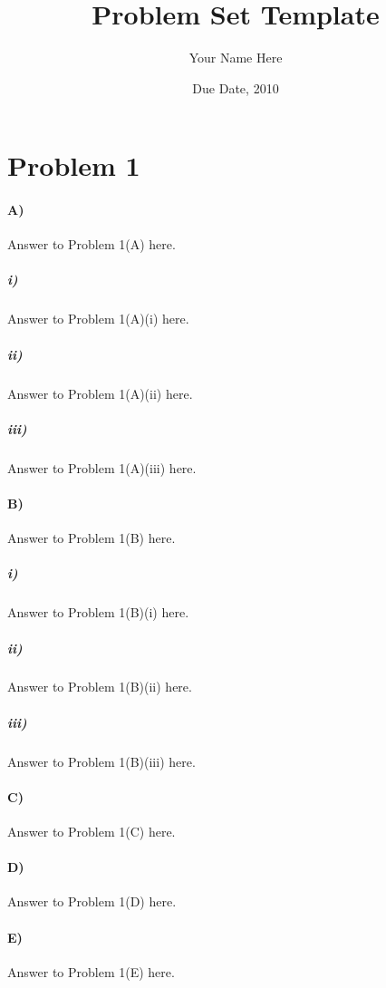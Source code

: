 \documentclass[10pt,letter]{article}
\begin{document}


\title{Problem Set Template}

\author{Your Name Here}

\date{Due Date, 2010}

\maketitle


\section*{Problem 1}

\paragraph{A)} Answer to Problem 1(A) here.

\subparagraph{i)} Answer to Problem 1(A)(i) here.

\subparagraph{ii)} Answer to Problem 1(A)(ii) here.

\subparagraph{iii)} Answer to Problem 1(A)(iii) here.

\paragraph{B)} Answer to Problem 1(B) here.

\subparagraph{i)} Answer to Problem 1(B)(i) here.

\subparagraph{ii)} Answer to Problem 1(B)(ii) here.

\subparagraph{iii)} Answer to Problem 1(B)(iii) here.

\paragraph{C)} Answer to Problem 1(C) here.

\paragraph{D)} Answer to Problem 1(D) here.

\paragraph{E)} Answer to Problem 1(E) here.
\end{document}
